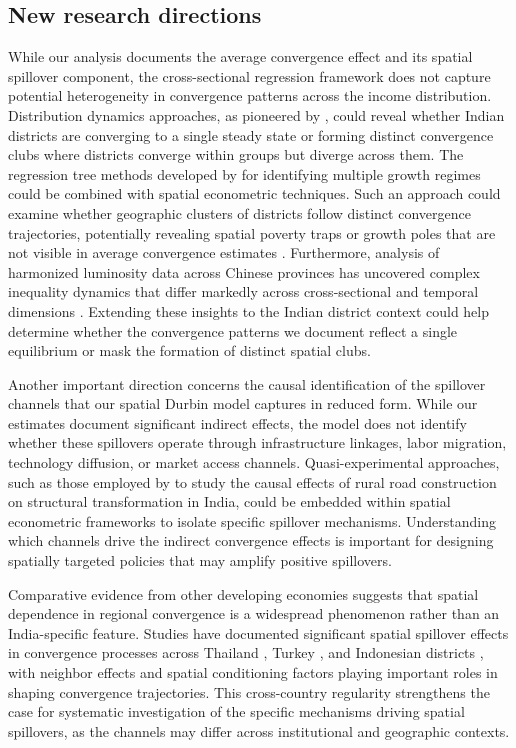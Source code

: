 \documentclass[
  a4paper, 
  twoside,
  review
]{article}
\begin{document}
\subsection{New research directions}\label{new-research-directions}

While our analysis documents the average convergence effect and its
spatial spillover component, the cross-sectional regression framework
does not capture potential heterogeneity in convergence patterns across
the income distribution. Distribution dynamics approaches, as pioneered
by \citet{quah_twin_peaks}, could reveal whether Indian districts are
converging to a single steady state or forming distinct convergence
clubs where districts converge within groups but diverge across them.
The regression tree methods developed by
\citet{durlauf_johnson_convergence_clubs} for identifying multiple
growth regimes could be combined with spatial econometric techniques.
Such an approach could examine whether geographic clusters of districts
follow distinct convergence trajectories, potentially revealing spatial
poverty traps or growth poles that are not visible in average
convergence estimates \citep{rey_spatial_dynamics}. Furthermore,
analysis of harmonized luminosity data across Chinese provinces has
uncovered complex inequality dynamics that differ markedly across
cross-sectional and temporal dimensions
\citep{glawe_mendez_china_luminosity}. Extending these insights to the
Indian district context could help determine whether the convergence
patterns we document reflect a single equilibrium or mask the formation
of distinct spatial clubs.

Another important direction concerns the causal identification of the
spillover channels that our spatial Durbin model captures in reduced
form. While our estimates document significant indirect effects, the
model does not identify whether these spillovers operate through
infrastructure linkages, labor migration, technology diffusion, or
market access channels. Quasi-experimental approaches, such as those
employed by \citet{asher_novosad_rural_roads} to study the causal
effects of rural road construction on structural transformation in
India, could be embedded within spatial econometric frameworks to
isolate specific spillover mechanisms. Understanding which channels
drive the indirect convergence effects is important for designing
spatially targeted policies that may amplify positive spillovers.

Comparative evidence from other developing economies suggests that
spatial dependence in regional convergence is a widespread phenomenon
rather than an India-specific feature. Studies have documented
significant spatial spillover effects in convergence processes across
Thailand \citep{tipayalai_mendez_thailand}, Turkey
\citep{ursavas_mendez_turkey}, and Indonesian districts
\citep{miranti_mendez_indonesia}, with neighbor effects and spatial
conditioning factors playing important roles in shaping convergence
trajectories. This cross-country regularity strengthens the case for
systematic investigation of the specific mechanisms driving spatial
spillovers, as the channels may differ across institutional and
geographic contexts.
\end{document}
